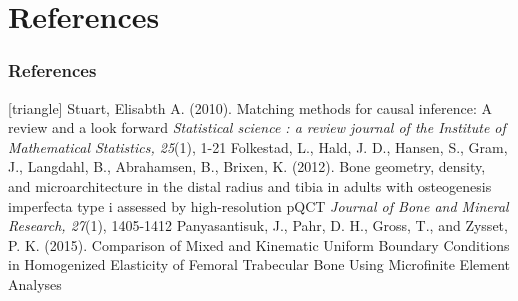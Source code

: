 \documentclass[xcolor=table]{beamer}
\begin{document}

\appendix

\section{References}
\begin{frame}
	\frametitle{References}
	\footnotesize{
		\begin{thebibliography}{99}
			[triangle]
			 Stuart, Elisabth A. (2010).
			\newblock Matching methods for causal inference: A review and a look forward
			\newblock \textit{Statistical science : a review journal of the Institute of Mathematical Statistics, 25}(1), 1-21
			\vspace{1mm}
			 Folkestad, L., Hald, J. D., Hansen, S., Gram, J., Langdahl, B., Abrahamsen, B., Brixen, K. (2012).
			\newblock Bone geometry, density, and microarchitecture in the distal radius and tibia in adults with osteogenesis imperfecta type i assessed by high-resolution pQCT
			\newblock \textit{Journal of Bone and Mineral Research, 27}(1), 1405-1412
			\vspace{1mm}
			 Panyasantisuk, J., Pahr, D. H., Gross, T., and Zysset, P. K. (2015).
			\newblock Comparison of Mixed and Kinematic Uniform Boundary Conditions in Homogenized Elasticity of Femoral Trabecular Bone Using Microfinite Element Analyses
		\end{thebibliography}
	}
\end{frame}

\end{document}
